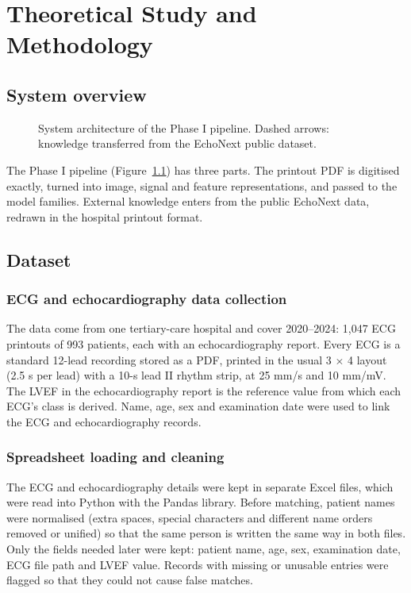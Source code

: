 \chapter{Theoretical Study and Methodology}\label{ch:3}

\section{System overview}\label{sec:3.1}

\begin{figure}[htbp]
\centering
\resizebox{\ifdim\width>\linewidth\linewidth\else\width\fi}{!}{}
\caption{System architecture of the Phase I pipeline. Dashed arrows: knowledge transferred from the EchoNext public dataset.}\label{fig:3.1}
\end{figure}

The Phase I pipeline (Figure~\ref{fig:3.1}) has three parts. The printout PDF is digitised exactly, turned into image, signal and feature representations, and passed to the model families. External knowledge enters from the public EchoNext data, redrawn in the hospital printout format.

\section{Dataset}\label{sec:3.2}

\subsection{ECG and echocardiography data collection}\label{sec:3.2.1}

The data come from one tertiary-care hospital and cover 2020--2024: 1,047 ECG printouts of 993 patients, each with an echocardiography report. Every ECG is a standard 12-lead recording stored as a PDF, printed in the usual 3 $\times$ 4 layout (2.5 s per lead) with a 10-s lead II rhythm strip, at 25 mm/s and 10 mm/mV. The LVEF in the echocardiography report is the reference value from which each ECG's class is derived. Name, age, sex and examination date were used to link the ECG and echocardiography records.

\subsection{Spreadsheet loading and cleaning}\label{sec:3.2.2}

The ECG and echocardiography details were kept in separate Excel files, which were read into Python with the Pandas library. Before matching, patient names were normalised (extra spaces, special characters and different name orders removed or unified) so that the same person is written the same way in both files. Only the fields needed later were kept: patient name, age, sex, examination date, ECG file path and LVEF value. Records with missing or unusable entries were flagged so that they could not cause false matches.

